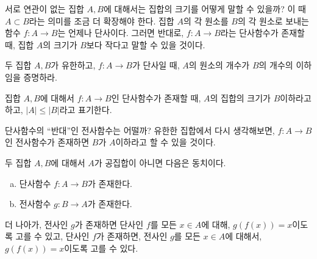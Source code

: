 서로 연관이 없는 집합 $A, B$에 대해서는 집합의 크기를 어떻게 말할 수 있을까?
이 때 $A \subset B$라는 의미를 조금 더 확장해야 한다.
집합 $A$의 각 원소를 $B$의 각 원소로 보내는 함수 $f: A \to B$는 언제나 단사이다.
그러면 반대로, $f: A \to B$라는 단사함수가 존재할 때, 집합 $A$의 크기가 $B$보다 작다고 말할 수 있을 것이다.
\begin{exercise}
    두 집합 $A, B$가 유한하고, $f: A \to B$가 단사일 때, $A$의 원소의 개수가 $B$의 개수의 이하임을 증명하라.
\end{exercise}
\begin{definition}
\label{def:cardinality}
    집합 $A, B$에 대해서 $f: A \to B$인 단사함수가 존재할 때, $A$의 집합의 크기가 $B$이하라고 하고, $|A| \leq |B|$라고 표기한다.
\end{definition}
단사함수의 ``반대''인 전사함수는 어떨까?
유한한 집합에서 다시 생각해보면, $f: A \to B$인 전사함수가 존재하면 $B$가 $A$이하라고 할 수 있을 것이다.
\begin{theorem}
\label{thm:lrinverse}
    두 집합 $A, B$에 대해서 $A$가 공집합이 아니면 다음은 동치이다.
    \begin{enumerate}[(a)]
        \item 단사함수 $f: A \to B$가 존재한다.
        \item 전사함수 $g: B \to A$가 존재한다.
    \end{enumerate}
    더 나아가, 전사인 $g$가 존재하면 단사인 $f$를 모든 $x \in A$에 대해, $g(f(x)) = x$이도록 고를 수 있고, 단사인 $f$가 존재하면, 전사인 $g$를 모든 $x \in A$에 대해서, $g(f(x)) = x$이도록 고를 수 있다.
\end{theorem}
